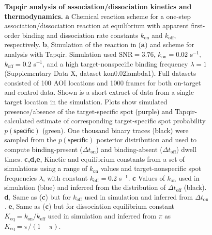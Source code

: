 \begin{figure}[t]
\caption{\textbf{Tapqir analysis of association/dissociation kinetics and thermodynamics.} \textbf{a} Chemical reaction scheme for a one-step association/dissociation reaction at equilibrium with apparent first-order binding and dissociation rate constants $k_{\mathrm{on}}$ and $k_{\mathrm{off}}$, respectively. \textbf{b}, Simulation of the reaction in (\textbf{a}) and scheme for analysis with Tapqir. Simulation used $\mathrm{SNR} = 3.76$, $k_\mathrm{on} = 0.02$ s$^{-1}$, $k_\mathrm{off} = 0.2$ s$^{-1}$, and a high target-nonspecific binding frequency $\lambda = 1$ (Supplementary Data X, dataset kon0.02lambda1). Full datasets consisted of 100 AOI locations and 1000 frames for both on-target and control data. Shown is a short extract of data from a single target location in the simulation.  Plots show simulated presence/absence of the target-specific spot  (purple) and Tapqir-calculated estimate of corresponding target-specific spot probability $p(\mathsf{specific})$ (green). One thousand binary traces (black) were sampled from the $p(\mathsf{specific})$ posterior distribution and used to compute binding-present ($\Delta t_\mathrm{on}$) and binding-absent ($\Delta t_\mathrm{off}$) dwell times. \textbf{c,d,e}, Kinetic and equilibrium constants from a set of simulations using a range of $k_\mathrm{on}$ values and  target-nonspecific spot frequencies $\lambda$, with constant $k_\mathrm{off} = 0.2$ s$^{-1}$. \textbf{c} Values of $k_{\mathrm{on}}$ used in simulation (blue) and inferred from the distribution of $\Delta t_\mathrm{off}$ (black). \textbf{d}, Same as (\textbf{c}) but for $k_{\mathrm{off}}$ used in simulation and inferred from $\Delta t_\mathrm{on}$. \textbf{e},  Same as (\textbf{c}) but for dissociation equilibrium constant $K_{\mathrm{eq}} = k_{\mathrm{on}} / k_{\mathrm{off}}$ used in simulation and inferred from $\pi$ as $K_{\mathrm{eq}} = \pi / (1 - \pi)$. }
\label{fig:kinetic_analysis}
\end{figure}

